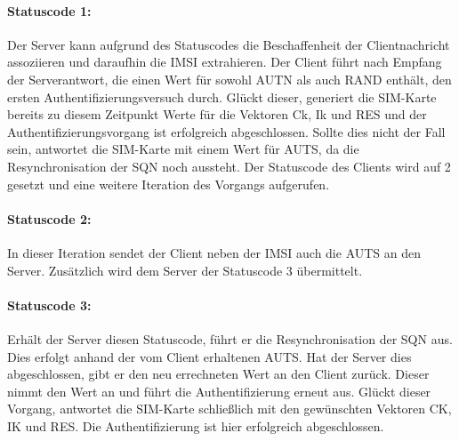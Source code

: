     \paragraph{Statuscode 1:} Der Server kann aufgrund des Statuscodes die Beschaffenheit
    der Clientnachricht assoziieren und daraufhin die IMSI extrahieren. Der Client führt
    nach Empfang der Serverantwort, die einen Wert für sowohl AUTN als auch RAND enthält, den
    ersten Authentifizierungsversuch durch. Glückt dieser, generiert die SIM-Karte bereits zu diesem
    Zeitpunkt Werte für die Vektoren Ck, Ik und RES und der Authentifizierungsvorgang ist
    erfolgreich abgeschlossen. Sollte dies nicht der Fall sein, antwortet die SIM-Karte mit einem Wert für
    AUTS, da die Resynchronisation der SQN noch aussteht. Der Statuscode des Clients wird auf 2 gesetzt
    und eine weitere Iteration des Vorgangs aufgerufen.

    \paragraph{Statuscode 2:} In dieser Iteration sendet der Client neben der IMSI auch die AUTS an den
    Server. Zusätzlich wird dem Server der Statuscode 3 übermittelt.

    \paragraph{Statuscode 3:} Erhält der Server diesen Statuscode, führt er die Resynchronisation der SQN
    aus. Dies erfolgt anhand der vom Client erhaltenen AUTS. Hat der Server dies abgeschlossen, gibt er
    den neu errechneten Wert an den Client zurück. Dieser nimmt den Wert an und führt die Authentifizierung
    erneut aus. Glückt dieser Vorgang, antwortet die SIM-Karte schließlich mit den gewünschten Vektoren
    CK, IK und RES. Die Authentifizierung ist hier erfolgreich abgeschlossen.

\clearpage
